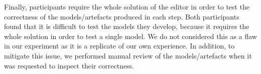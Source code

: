 Finally, participants require the whole solution of the editor in order to test the correctness of the models/artefacts produced in each step. Both participants found that it is difficult to test the models they develop, because it requires the whole solution in order to test a single model. We do not considered this as a flaw in our experiment as it is a replicate of our own experience.
In addition, to mitigate this issue, we performed manual review of the models/artefacts when it was requested to inspect their correctness.
